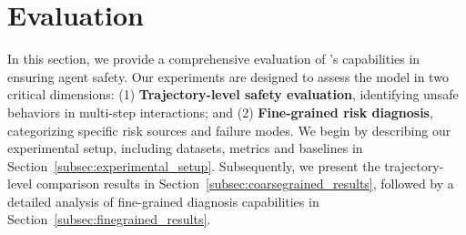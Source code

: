 \section{Evaluation}
In this section, we provide a comprehensive evaluation of \toolAG{}'s capabilities in ensuring agent safety. Our experiments are designed to assess the model in two critical dimensions: (1) \textbf{Trajectory-level safety evaluation}, identifying unsafe behaviors in multi-step interactions; and (2) \textbf{Fine-grained risk diagnosis}, categorizing specific risk sources and failure modes. We begin by describing our experimental setup, including datasets, metrics and baselines in Section~\ref{subsec:experimental_setup}. Subsequently, we present the trajectory-level comparison results in Section~\ref{subsec:coarsegrained_results}, followed by a detailed analysis of fine-grained diagnosis capabilities in Section~\ref{subsec:finegrained_results}.

